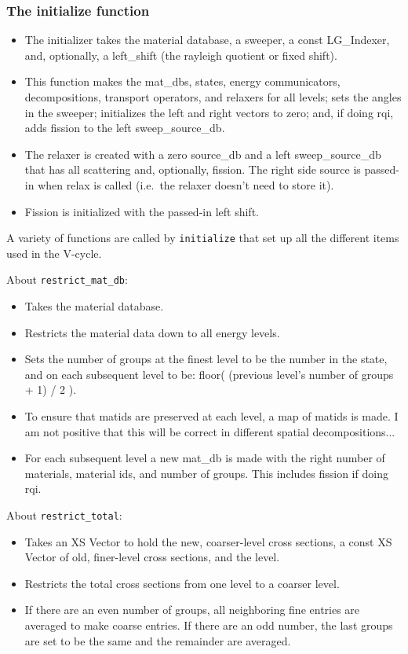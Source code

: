 \documentclass[12pt, letterpaper]{article}
\begin{document}
\subsubsection{The initialize function}
\begin{itemize}
  \item The initializer takes the material database, a sweeper, a const LG\_Indexer, and, optionally, a left\_shift (the rayleigh quotient or fixed shift).
  \item This function makes the mat\_dbs, states, energy communicators, decompositions, transport operators, and relaxers for all levels; sets the angles in the sweeper; initializes the left and right vectors to zero; and, if doing rqi, adds fission to the left sweep\_source\_db.
  \item The relaxer is created with a zero source\_db and a left sweep\_source\_db that has all scattering and, optionally, fission. The right side source is passed-in when relax is called (i.e.\ the relaxer doesn't need to store it).
  \item Fission is initialized with the passed-in left shift. 
\end{itemize}

\noindent A variety of functions are called by \verb+initialize+ that set up all the different items used in the V-cycle.

\noindent About \verb+restrict_mat_db+:
\begin{itemize}
  \item Takes the material database.
  \item Restricts the material data down to all energy levels.
  \item Sets the number of groups at the finest level to be the number in the state, and on each subsequent level to be: floor( (previous level's number of groups + 1) / 2 ).
  \item To ensure that matids are preserved at each level, a map of matids is made. I am not positive that this will be correct in different spatial decompositions...
  \item For each subsequent level a new mat\_db is made with the right number of materials, material ids, and number of groups. This includes fission if doing rqi.
\end{itemize}

\noindent About \verb+restrict_total+:
\begin{itemize}
  \item Takes an XS Vector to hold the new, coarser-level cross sections, a const XS Vector of old, finer-level cross sections, and the level.
  \item Restricts the total cross sections from one level to a coarser level.
  \item If there are an even number of groups, all neighboring fine entries are averaged to make coarse entries. If there are an odd number, the last groups are set to be the same and the remainder are averaged.
\end{itemize}  
  
\end{document}
